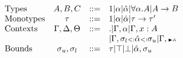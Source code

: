 \documentclass[paper.tex]{subfiles}
\begin{document}
\[
\begin{array}{lccl}
\text{Types} & A,B,C &::=& 1 | \alpha | \hat{\alpha} | \forall \alpha.A | A \rightarrow B\\
\text{Monotypes} & \tau &::=& 1 | \alpha | \hat{\alpha} | \tau \rightarrow \tau'\\
\text{Contexts} & \Gamma, \Delta, \Theta &::=& . | \Gamma, \alpha | \Gamma, x:A \\ &&& | \Gamma, \sigma_{l} {\scriptstyle{<:}} \hat{\alpha} {\scriptstyle{<:}} \sigma_{u} | \Gamma, {\scriptscriptstyle {\blacktriangleright \hat{\alpha}}}\\
\text{Bounds} & \sigma_{u}, \sigma_{l} &::=& \tau | \top | \bot | \hat{\alpha}, \sigma_{u}
\end{array}
\]
\end{document}
